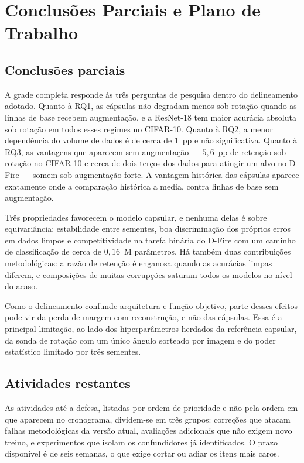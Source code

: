 \chapter{Conclusões Parciais e Plano de Trabalho}
\label{ch:conclusao}

\section{Conclusões parciais}
\label{sec:conc:rq}

A grade completa responde às três perguntas de pesquisa dentro do delineamento
adotado. Quanto à RQ1, as cápsulas não degradam menos sob rotação quando as
linhas de base recebem augmentação, e a ResNet-18 tem maior acurácia absoluta
sob rotação em todos esses regimes no CIFAR-10. Quanto à RQ2, a menor
dependência do volume de dados é de cerca de $1$~pp e não significativa. Quanto
à RQ3, as vantagens que aparecem sem augmentação --- $5{,}6$~pp de retenção sob
rotação no CIFAR-10 e cerca de dois terços dos dados para atingir um alvo no
D-Fire --- somem sob augmentação forte. A vantagem histórica das cápsulas
aparece exatamente onde a comparação histórica a media, contra linhas de base
sem augmentação.

Três propriedades favorecem o modelo capsular, e nenhuma delas é sobre
equivariância: estabilidade entre sementes, boa discriminação dos próprios erros
em dados limpos e competitividade na tarefa binária do D-Fire com um caminho de
classificação de cerca de $0{,}16$~M parâmetros. Há também duas contribuições
metodológicas: a razão de retenção é enganosa quando as acurácias limpas
diferem, e composições de muitas corrupções saturam todos os modelos no nível do
acaso.

Como o delineamento confunde arquitetura e função objetivo, parte desses efeitos
pode vir da perda de margem com reconstrução, e não das cápsulas. Essa é a
principal limitação, ao lado dos hiperparâmetros herdados da referência
capsular, da sonda de rotação com um único ângulo sorteado por imagem e do poder
estatístico limitado por três sementes.

\section{Atividades restantes}
\label{sec:conc:futuros}

As atividades até a defesa, listadas por ordem de prioridade e não pela ordem em
que aparecem no cronograma, dividem-se em três grupos: correções que atacam
falhas metodológicas da versão atual, avaliações adicionais que não exigem novo
treino, e experimentos que isolam os confundidores já identificados. O prazo
disponível é de seis semanas, o que exige cortar ou adiar os itens mais caros.

